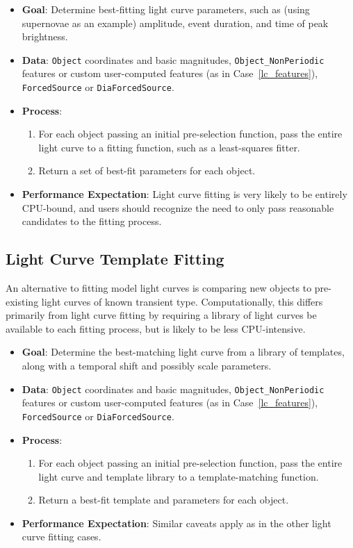 \documentclass[DM,authoryear,toc]{lsstdoc}
\begin{document}
\begin{itemize}
  \item \textbf{Goal}: Determine best-fitting light curve parameters, such as
  (using supernovae as an example) amplitude, event duration, and time of peak brightness.
  \item \textbf{Data}: \texttt{Object} coordinates and basic magnitudes,
  \texttt{Object\_NonPeriodic} features or custom user-computed features (as in
  Case~\ref{lc_features}),
  \texttt{ForcedSource} or \texttt{DiaForcedSource}.
  \item \textbf{Process}:
    \begin{enumerate}
      \item For each object passing an initial pre-selection function, pass the
      entire light curve to a fitting function, such as a least-squares fitter.
      \item Return a set of best-fit parameters for each object.
    \end{enumerate}
  \item \textbf{Performance Expectation}: Light curve fitting is very likely to
  be entirely CPU-bound, and users should recognize the need to only pass
  reasonable candidates to the fitting process.
\end{itemize}

\subsection{Light Curve Template Fitting}

An alternative to fitting model light curves is comparing new objects to
pre-existing light curves of known transient type. Computationally, this differs
primarily from light curve fitting by requiring a library of light curves be
available to each fitting process, but is likely to be less CPU-intensive.

\begin{itemize}
  \item \textbf{Goal}: Determine the best-matching light curve from a library of
  templates, along with a temporal shift and possibly scale parameters. \item
  \textbf{Data}: \texttt{Object} coordinates and basic magnitudes,
  \texttt{Object\_NonPeriodic} features or custom user-computed features (as in
  Case~\ref{lc_features}),
  \texttt{ForcedSource} or \texttt{DiaForcedSource}.
  \item \textbf{Process}:
    \begin{enumerate}
      \item For each object passing an initial pre-selection function, pass the
      entire light curve and template library to a template-matching function.
      \item Return a best-fit template and parameters for each object.
    \end{enumerate}
  \item \textbf{Performance Expectation}: Similar caveats apply as in the other
  light curve fitting cases.
\end{itemize}
\end{document}
